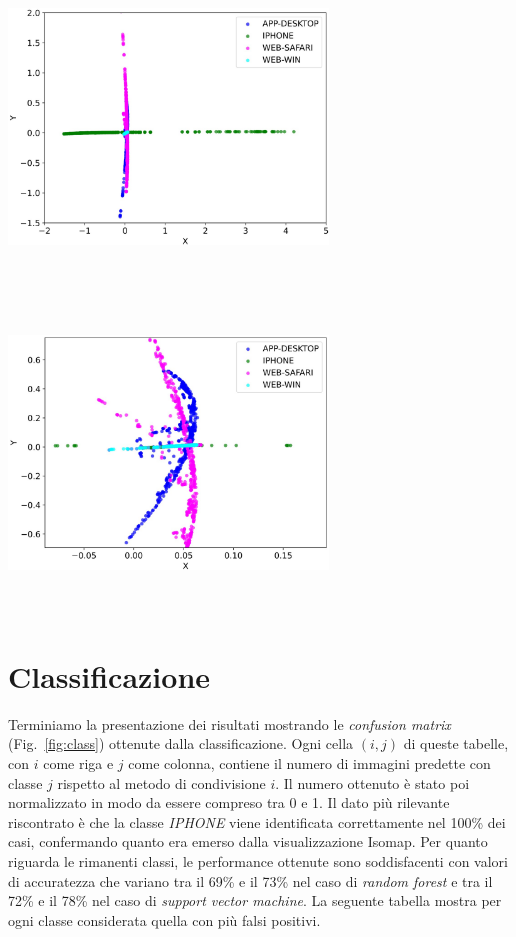     \includegraphics[width=8.5cm, height=8.5cm, keepaspectratio]{Immagini/Isomap/isomap.jpg}\includegraphics[width=8.5cm, height=8.5cm, keepaspectratio]{Immagini/Isomap/zoom_isomap.jpg}
    \label{fig:all_isomap}
\endgroup

\section{Classificazione}
\label{sec:classification_results}
Terminiamo la presentazione dei risultati mostrando le \textit{confusion matrix} (Fig.~\ref{fig:class}) ottenute dalla classificazione. Ogni cella $(i,j)$ di queste tabelle, con $i$ come riga e $j$ come colonna, contiene il numero di immagini predette con classe $j$ rispetto al metodo di condivisione $i$. Il numero ottenuto è stato poi normalizzato in modo da essere compreso tra 0 e 1. Il dato più rilevante riscontrato è che la classe \textit{IPHONE} viene identificata correttamente nel 100\% dei casi, confermando quanto era emerso dalla visualizzazione Isomap. Per quanto riguarda le rimanenti classi, le performance ottenute sono soddisfacenti con valori di accuratezza che variano tra il 69\% e il 73\% nel caso di \textit{random forest} e tra il 72\% e il 78\% nel caso di \textit{support vector machine}. La seguente tabella mostra per ogni classe considerata quella con più falsi positivi.

